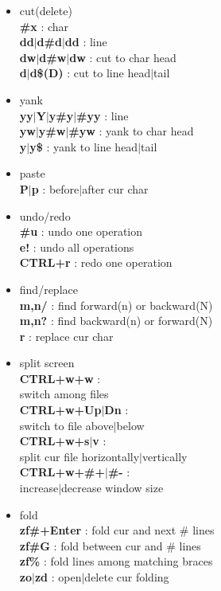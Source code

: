 \documentclass[10pt, a4paper]{article}
\begin{document}
\begin{enumerate}
\begin{itemize}
    \item cut(delete) \\
    \textbf{\#x} : char \\
    \textbf{dd{$|$}d\#d{$|$}dd} : line \\
    \textbf{dw{$|$}d\#w{$|$}dw} : cut to char head \\
    \textbf{d\^{$|$}d\$(D)} : cut to line head{$|$}tail
    \item yank \\
    \textbf{yy{$|$}Y{$|$}y\#y{$|$}\#yy} : line \\
    \textbf{yw{$|$}y\#w{$|$}\#yw} : yank to char head \\
    \textbf{y\^{$|$}y\$} : yank to line head{$|$}tail
    \item paste \\
    \textbf{P{$|$}p} : before{$|$}after cur char
    \item undo/redo \\
    \textbf{\#u} : undo one operation\\ 
    \textbf{e!} : undo all operations \\
    \textbf{CTRL+r} : redo one operation
    \item find/replace \\
    \textbf{m,n/} : find forward(n) or backward(N) \\ 
    \textbf{m,n?} : find backward(n) or forward(N) \\
    \textbf{r} : replace cur char
    \item split screen \\
    \textbf{CTRL+w+w} : \\ switch among files \\
    \textbf{CTRL+w+Up{$|$}Dn} : \\ switch to file above{$|$}below \\
    \textbf{CTRL+w+s{$|$}v} : \\ split cur file horizontally{$|$}vertically \\
    \textbf{CTRL+w+\#+{$|$}\#-} : \\ increase{$|$}decrease window size 
    \item fold \\
    \textbf{zf\#+Enter} : fold cur and next \# lines \\
    \textbf{zf\#G} : fold between cur and \# lines \\
    \textbf{zf\%} : fold lines among matching braces \\
    \textbf{zo{$|$}zd} : open{$|$}delete cur folding \\

\end{itemize}
\end{enumerate}
\end{document}
